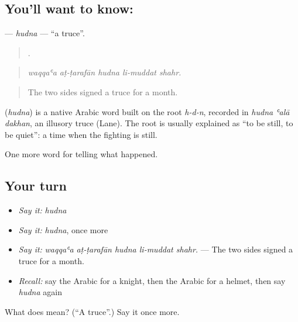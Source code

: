 \subsection*{You'll want to know: }
\textbf{} — \emph{hudna} — \textquotedblleft{}a truce\textquotedblright{}.

\begin{quote}
    .
\end{quote}

\begin{quote}
\emph{waqqaʿa aṭ-ṭarafān hudna li-muddat shahr.}
\end{quote}

\begin{quote}
The two sides signed a truce for a month.
\end{quote}

\begin{cousinweb}
\textbf{} (\emph{hudna}) is a native Arabic word built on the root \emph{h-d-n}, recorded in \emph{hudna ʿalā dakhan}, an illusory truce (Lane). The root is usually explained as \textquotedblleft{}to be still, to be quiet\textquotedblright{}: a time when the fighting is still.
\end{cousinweb}

\begin{grammarlens}[title={What you've built}]
One more word for telling what happened.
\end{grammarlens}

\subsection*{Your turn}
\begin{itemize}
\raggedright
  \item \emph{Say it:} \emph{hudna}
  \item \emph{Say it:} \emph{hudna}, once more
  \item \emph{Say it:} \emph{waqqaʿa aṭ-ṭarafān hudna li-muddat shahr.} — The two sides signed a truce for a month.
  \item \emph{Recall:} say the Arabic for a knight, then the Arabic for a helmet, then say \emph{hudna} again
\end{itemize}

\begin{tcolorbox}[breakable,colback=teal!4,colframe=teal!35!black,title={Before you move on}]
What does  mean? (\textquotedblleft{}A truce\textquotedblright{}.) Say it once more.
\end{tcolorbox}
